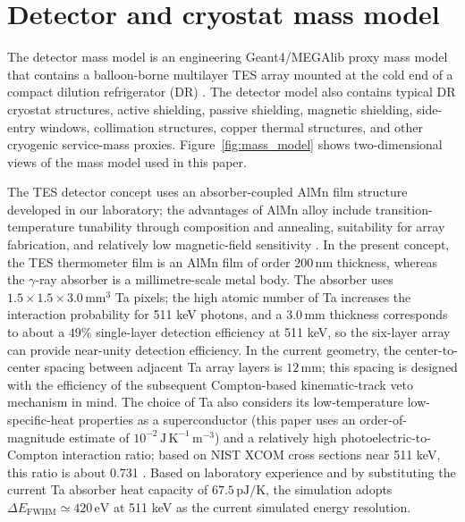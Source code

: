 \documentclass[pdflatex,sn-mathphys-num]{sn-jnl}
\begin{document}
\section{Detector and cryostat mass model}
\label{sec:geometry}

The detector mass model is an engineering Geant4/MEGAlib proxy mass model that contains a balloon-borne multilayer TES array mounted at the cold end of a compact dilution refrigerator (DR) \cite{Shirazi2023,Gottardi2021TESReview}. The detector model also contains typical DR cryostat structures, active shielding, passive shielding, magnetic shielding, side-entry windows, collimation structures, copper thermal structures, and other cryogenic service-mass proxies. Figure~\ref{fig:mass_model} shows two-dimensional views of the mass model used in this paper.

The TES detector concept uses an absorber-coupled AlMn film structure developed in our laboratory; the advantages of AlMn alloy include transition-temperature tunability through composition and annealing, suitability for array fabrication, and relatively low magnetic-field sensitivity \cite{Xie2026AlMn,Vavagiakis2017AlMnMagnetic}. In the present concept, the TES thermometer film is an AlMn film of order $200\,\mathrm{nm}$ thickness, whereas the $\gamma$-ray absorber is a millimetre-scale metal body. The absorber uses $1.5\times1.5\times3.0\,\mathrm{mm^3}$ Ta pixels; the high atomic number of Ta increases the interaction probability for 511 keV photons, and a $3.0\,\mathrm{mm}$ thickness corresponds to about a $49\%$ single-layer detection efficiency at 511 keV, so the six-layer array can provide near-unity detection efficiency. In the current geometry, the center-to-center spacing between adjacent Ta array layers is $12\,\mathrm{mm}$; this spacing is designed with the efficiency of the subsequent Compton-based kinematic-track veto mechanism in mind. The choice of Ta also considers its low-temperature low-specific-heat properties as a superconductor (this paper uses an order-of-magnitude estimate of $10^{-2}\,\mathrm{J\,K^{-1}\,m^{-3}}$) and a relatively high photoelectric-to-Compton interaction ratio; based on NIST XCOM cross sections near 511 keV, this ratio is about 0.731 \cite{NISTXCOM}. Based on laboratory experience and by substituting the current Ta absorber heat capacity of $67.5\,\mathrm{pJ/K}$, the simulation adopts $\Delta E_{\mathrm{FWHM}}\simeq420\,\mathrm{eV}$ at 511 keV as the current simulated energy resolution.
\end{document}
